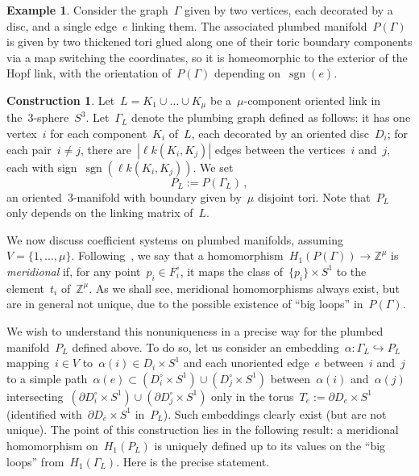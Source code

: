 \documentclass[10.9pt,a4paper]{amsart}
\theoremstyle{definition}
\newtheorem{construction}[theorem]{Construction}
\newtheorem{example}[theorem]{Example}
\theoremstyle{remark}
\newcommand{\Z}{\mathbb{Z}}
\newcommand{\lk}{\ell k}
\newcommand{\sgn}{\operatorname{sgn}}
\begin{document}
\begin{example}
\label{ex:P}
Consider the graph~$\Gamma$ given by two vertices, each decorated by a disc, and a single edge~$e$ linking them.
The associated plumbed manifold~$P(\Gamma)$ is given by two thickened tori glued along one of their toric boundary components via a map switching the coordinates, so it is homeomorphic to the exterior of the Hopf link, with the orientation of~$P(\Gamma)$ depending on~$\sgn(e)$.
\end{example}


\begin{construction}
\label{cons:PL}
Let~$L = K_1 \cup \ldots \cup K_\mu$ be a~$\mu$-component oriented link in the~3-sphere~$S^3$.
Let~$\Gamma_L$ denote the plumbing graph defined as follows: it has one vertex~$i$ for each component~$K_i$ of~$L$, each decorated by an oriented disc~$D_i$; for each pair~$i\neq j$, there are~$|\lk(K_i,K_j)|$ edges between the vertices~$i$ and~$j$, 
each with sign~$\sgn(\lk(K_i,K_j))$. We set
\[
P_L:=P(\Gamma_L)\,,
\]
an oriented~$3$-manifold with boundary given by~$\mu$ disjoint tori. Note that~$P_L$ only depends on the
linking matrix of~$L$.
\end{construction}





We now discuss coefficient systems on plumbed manifolds, assuming~$V=\{1,\dots,\mu\}$. 
Following~\cite{ConwayNagelToffoli}, we say that a homomorphism~$H_1(P(\Gamma)) \to \Z^\mu$ is {\em meridional\/} if, for any point~$p_i\in F^\circ_i$, it maps the class of~$\{p_i\}\times S^1$ to the element~$t_i$ of~$\Z^\mu$.
As we shall see, meridional homomorphisms always exist, but are in general not unique, due to the possible
existence of ``big loops'' in~$P(\Gamma)$.


We wish to understand this nonuniqueness in a precise way for the plumbed manifold~$P_L$ defined above.
To do so, let us consider an embedding~$\alpha\colon\Gamma_L\hookrightarrow P_L$ 
mapping~$i\in V$ to~$\alpha(i)\in D_i\times S^1$ and each unoriented edge~$e$ between~$i$ and~$j$ to a simple path~$\alpha(e)\subset (D_i^\circ \times S^1) \cup (D_j^\circ \times S^1)$ between~$\alpha(i)$ and~$\alpha(j)$ intersecting~$(\partial D_i^\circ \times S^1)\cup(\partial D_j^\circ \times S^1)$ only in the torus~$T_e:=\partial D_e \times S^1$ (identified with~$\partial D_{\overline{e}} \times S^1$ in~$P_L$).
Such embeddings clearly exist (but are not unique).
The point of this construction lies in the following result: a meridional homomorphism on~$H_1(P_L)$ is uniquely defined
up to its values on the ``big loops'' from~$H_1(\Gamma_L)$. Here is the precise statement.
\end{document}
